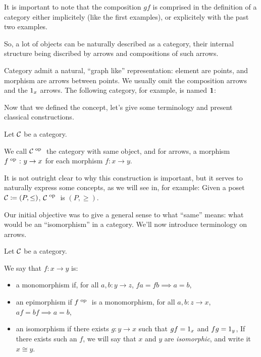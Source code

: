 \documentclass[a4paper]{article}
\theoremstyle { remark }
\theoremstyle { definition }
\newtheorem { definition } { Definition }
\newtheorem { example } { Example }
\theoremstyle { plain }
\begin{document}
It is important to note that the composition \( gf \) is comprised in the definition of a category either implicitely (like the first examples), or explicitely with the past two examples.

So, a lot of objects can be naturally described as a category, their internal structure being discribed by arrows and compositions of such arrows.

Category admit a natural, \enquote{graph like} representation: element are points, and morphism are arrows between points.
We usually omit the composition arrows and the \( \one[x] \) arrows.
The following category, for example, is named \(  \mathbf { 1 }  \):

\begin{center}
\end{center}

Now that we defined the concept, let's give some terminology and present classical constructions.

\begin{definition}[\( \Cop \)]
Let \(  \mathcal { C }  \) be a category.

We call \( \Cop \) the category with same object, and for arrows, a morphism \(  {f} ^ \text { op }  \colon y \to x \) for each morphism \( f \colon x \to y \).
\end{definition}

\begin{example}
It is not outright clear to why this construction is important, but it serves to naturally express some concepts, as we will see in, for example: 
Given a poset \(  \mathcal { C }  \coloneqq (P, \leq) \), \( \Cop \) is \( (P, \geq) \).
\end{example}

Our initial objective was to give a general sense to what \enquote{same} means: what would be an \enquote{isomorphism} in a category.
We'll now introduce terminology on arrows.

\begin{definition}
Let \(  \mathcal { C }  \) be a category.

We say that \( f \colon x \to y \) is:
\begin{itemize}
  \item a monomorphism if, for all \( a, b \colon y \to z \), \( fa = fb \implies a = b \),
  \item an epimorphism if \(  {f} ^ \text { op }  \) is a monomorphism, \ie{} for all \( a, b \colon z \to x \), \( af = bf \implies a = b \),
  \item an isomorphism if there exists \( g \colon y \to x \) such that \( gf = \one[x] \) and \( fg = \one[y] \),
    If there exists such an \( f \), we will say that \( x \) and \( y \) are \emph{isomorphic}, and write it \( x \cong y \).
\end{itemize}
\end{definition}
\end{document}

